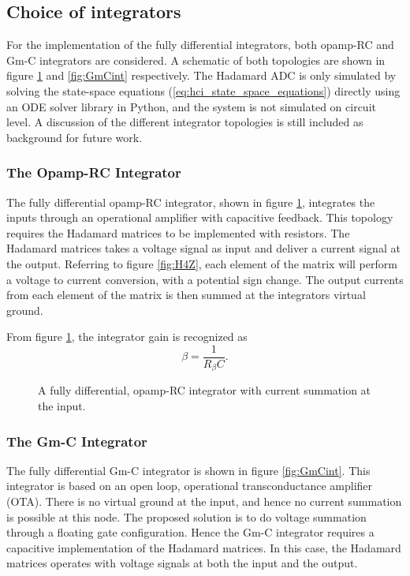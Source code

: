 \subsection{Choice of integrators}
For the implementation of the fully differential integrators, both opamp-RC and Gm-C integrators are considered. A schematic of both topologies are shown in figure \ref{fig:OpampRCint_fd} and \ref{fig:GmCint} respectively. The Hadamard ADC is only simulated by solving the state-space equations (\ref{eq:hci_state_space_equations}) directly using an ODE solver library in Python, and the system is not simulated on circuit level. A discussion of the different integrator topologies is still included as background for future work.


\subsubsection*{The Opamp-RC Integrator}
The fully differential opamp-RC integrator, shown in figure \ref{fig:OpampRCint_fd}, integrates the inputs through an operational amplifier with capacitive feedback. This topology requires the Hadamard matrices to be implemented with resistors. The Hadamard matrices takes a voltage signal as input and deliver a current signal at the output. Referring to figure \ref{fig:H4Z}, each element of the matrix will perform a voltage to current conversion, with a potential sign change. The output currents from each element of the matrix is then summed at the integrators virtual ground.

From figure \ref{fig:OpampRCint_fd}, the integrator gain is recognized as
\begin{equation}
    \beta = \frac{1}{R_\beta C}.
\end{equation}

\begin{figure}[htbp]
    \centering
    
    \caption{A fully differential, opamp-RC integrator with current summation at the input.}
    \label{fig:OpampRCint_fd}
\end{figure}

\subsubsection*{The Gm-C Integrator}
The fully differential Gm-C integrator is shown in figure \ref{fig:GmCint}. This integrator is based on an open loop, operational transconductance amplifier (OTA). There is no virtual ground at the input, and hence no current summation is possible at this node. The proposed solution is to do voltage summation through a floating gate configuration. Hence the Gm-C integrator requires a capacitive implementation of the Hadamard matrices. In this case, the Hadamard matrices operates with voltage signals at both the input and the output.

